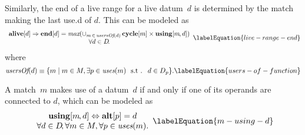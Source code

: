 Similarly, the end of a \gls{live range} for a live \gls{datum}~$d$ is
determined by the \gls{match} making the last \gls{use.d} of $d$\hspace{-1pt}.
%
This can be modeled as
%
\begin{equation}
  \begin{array}{c}
    \mVar{alive}[d]
    \mImp
    \mVar{end}[d] = \mMax(
                           \cup_{m \,\in\, \mUsersOf(d)} \,
                           \mVar{cycle}[m]
                           \times
                           \mVar{using}[m \hspace{-1pt}, d]
                         ) \\
    \forall d \in \mDataSet \!.
  \end{array}
  \labelEquation{live-range-end}
\end{equation}
%
where
%
\begin{equation}
  \mUsersOf(d)
  \equiv
  \mSetBuilder{m}%
              {
                m \in \mMatchSet,
                \exists p \in \mUses(m)
                \text{ \st } d \in \mDataSet[p]
              }.
  \labelEquation{users-of-function}
\end{equation}

A \gls{match}~$m$ makes use of a \gls{datum}~$d$ if and only if one of its
\glspl{operand} are connected to $d$\hspace{-1pt}, which can be modeled as
%
\begin{equation}
  \begin{array}{c}
    \mVar{using}[m \hspace{-1pt}, d]
    \mEq
    \mVar{alt}[p] = d \\
    \forall d \in \mDataSet \!,
    \forall m \in \mMatchSet,
    \forall p \in \mUses(m).
  \end{array}
  \labelEquation{m-using-d}
\end{equation}

